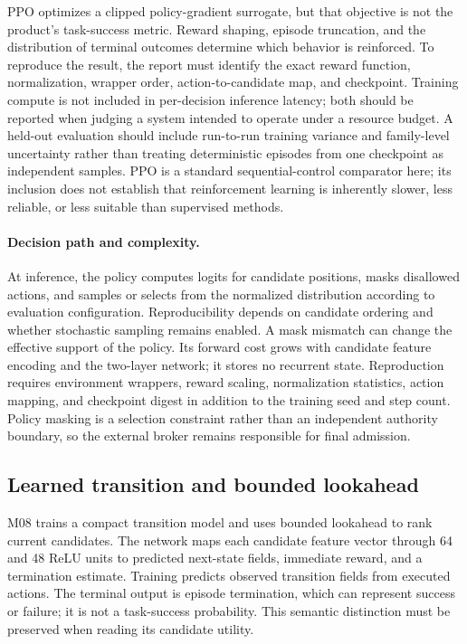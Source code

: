 PPO optimizes a clipped policy-gradient surrogate, but that objective is not the product's task-success metric. Reward shaping, episode truncation, and the distribution of terminal outcomes determine which behavior is reinforced. To reproduce the result, the report must identify the exact reward function, normalization, wrapper order, action-to-candidate map, and checkpoint. Training compute is not included in per-decision inference latency; both should be reported when judging a system intended to operate under a resource budget. A held-out evaluation should include run-to-run training variance and family-level uncertainty rather than treating deterministic episodes from one checkpoint as independent samples. PPO is a standard sequential-control comparator here; its inclusion does not establish that reinforcement learning is inherently slower, less reliable, or less suitable than supervised methods.


\paragraph{Decision path and complexity.} At inference, the policy computes logits for candidate positions, masks disallowed actions, and samples or selects from the normalized distribution according to evaluation configuration. Reproducibility depends on candidate ordering and whether stochastic sampling remains enabled. A mask mismatch can change the effective support of the policy. Its forward cost grows with candidate feature encoding and the two-layer network; it stores no recurrent state. Reproduction requires environment wrappers, reward scaling, normalization statistics, action mapping, and checkpoint digest in addition to the training seed and step count. Policy masking is a selection constraint rather than an independent authority boundary, so the external broker remains responsible for final admission.

\subsection{Learned transition and bounded lookahead}\label{sec:method-m08}
M08 trains a compact transition model and uses bounded lookahead to rank current candidates. The network maps each candidate feature vector through 64 and 48 ReLU units to predicted next-state fields, immediate reward, and a termination estimate. Training predicts observed transition fields from executed actions. The terminal output is episode termination, which can represent success or failure; it is not a task-success probability. This semantic distinction must be preserved when reading its candidate utility.

